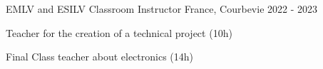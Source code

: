 \begin{cventries}
  \cventry
    {EMLV and ESILV} %
    {Classroom Instructor} %
    {France, Courbevie} %
    {2022 - 2023} %
    {
      \begin{cvitems} %
        \item {Teacher for the creation of a technical project (10h)}
        \item {Final Class teacher about electronics (14h)}
      \end{cvitems}
    }
    {}

\end{cventries}
